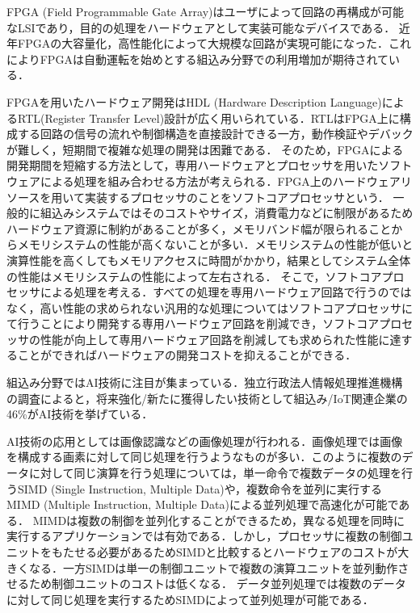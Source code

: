 FPGA (Field Programmable Gate Array)はユーザによって回路の再構成が可能なLSIであり，目的の処理をハードウェアとして実装可能なデバイスである．
近年FPGAの大容量化，高性能化によって大規模な回路が実現可能になった．これによりFPGAは自動運転を始めとする組込み分野での利用増加が期待されている．

FPGAを用いたハードウェア開発はHDL (Hardware Description Language)によるRTL(Register Transfer Level)設計が広く用いられている．RTLはFPGA上に構成する回路の信号の流れや制御構造を直接設計できる一方，動作検証やデバックが難しく，短期間で複雑な処理の開発は困難である\cite{bib:fpga}．
そのため，FPGAによる開発期間を短縮する方法として，専用ハードウェアとプロセッサを用いたソフトウェアによる処理を組み合わせる方法が考えられる．FPGA上のハードウェアリソースを用いて実装するプロセッサのことをソフトコアプロセッサという．
一般的に組込みシステムではそのコストやサイズ，消費電力などに制限があるためハードウェア資源に制約があることが多く，メモリバンド幅が限られることからメモリシステムの性能が高くないことが多い．メモリシステムの性能が低いと演算性能を高くしてもメモリアクセスに時間がかかり，結果としてシステム全体の性能はメモリシステムの性能によって左右される\cite{bib:2}．
そこで，ソフトコアプロセッサによる処理を考える．すべての処理を専用ハードウェア回路で行うのではなく，高い性能の求められない汎用的な処理についてはソフトコアプロセッサにて行うことにより開発する専用ハードウェア回路を削減でき，ソフトコアプロセッサの性能が向上して専用ハードウェア回路を削減しても求められた性能に達することができればハードウェアの開発コストを抑えることができる．

組込み分野ではAI技術に注目が集まっている．独立行政法人情報処理推進機構の調査によると，将来強化/新たに獲得したい技術として組込み/IoT関連企業の46\%がAI技術を挙げている\cite{bib:ipa}．

AI技術の応用としては画像認識などの画像処理が行われる．画像処理では画像を構成する画素に対して同じ処理を行うようなものが多い．このように複数のデータに対して同じ演算を行う処理については，単一命令で複数データの処理を行うSIMD (Single Instruction, Multiple Data)や，複数命令を並列に実行するMIMD (Multiple Instruction, Multiple Data)による並列処理で高速化が可能である\cite{bib:simd_mimd}．
MIMDは複数の制御を並列化することができるため，異なる処理を同時に実行するアプリケーションでは有効である．しかし，プロセッサに複数の制御ユニットをもたせる必要があるためSIMDと比較するとハードウェアのコストが大きくなる．一方SIMDは単一の制御ユニットで複数の演算ユニットを並列動作させるため制御ユニットのコストは低くなる．
データ並列処理では複数のデータに対して同じ処理を実行するためSIMDによって並列処理が可能である．

